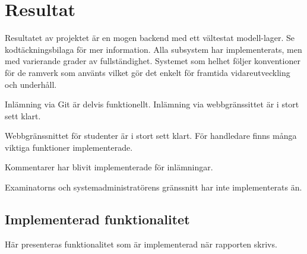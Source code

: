 \section{Resultat}
Resultatet av projektet är en mogen backend med ett vältestat modell-lager. Se kodtäckningsbilaga för mer information. Alla subsystem har implementerats, men med varierande grader av fullständighet. Systemet som helhet följer konventioner för de ramverk som använts vilket gör det enkelt för framtida vidareutveckling och underhåll.

Inlämning via Git är delvis funktionellt. Inlämning via webbgränssittet är i stort sett klart.

Webbgränssnittet för studenter är i stort sett klart. För handledare finns många viktiga funktioner implementerade.

Kommentarer har blivit implementerade för inlämningar.

Examinatorns och systemadministratörens gränssnitt har inte implementerats än.

\subsection{Implementerad funktionalitet}
Här presenteras funktionalitet som är implementerad när rapporten skrivs.
